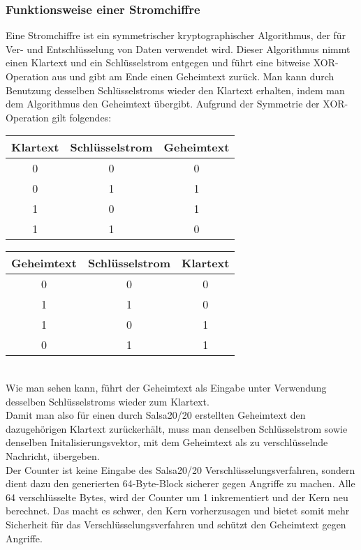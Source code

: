 \documentclass[course=erap]{aspdoc}
\begin{document}
\subsubsection{Funktionsweise einer Stromchiffre}
Eine Stromchiffre ist ein symmetrischer kryptographischer Algorithmus, der für Ver- und Entschlüsselung von Daten verwendet wird. 
Dieser Algorithmus nimmt einen Klartext und ein Schlüsselstrom entgegen und führt eine bitweise XOR-Operation aus und gibt am Ende 
einen Geheimtext zurück. 
Man kann durch Benutzung desselben Schlüsselstroms wieder den Klartext erhalten, indem man dem Algorithmus den Geheimtext übergibt.
Aufgrund der Symmetrie der XOR-Operation gilt folgendes:
\begin{table}[!h]
    \begin{tabular}{|c|c|c|}
    \hline
    Klartext & Schlüsselstrom & Geheimtext \\
    \hline
    0 & 0 & 0  \\
    0 & 1 & 1  \\
    1 & 0 & 1  \\
    1 & 1 & 0  \\
    \hline
    \end{tabular}
    \begin{tabular}{|c|c|c|}
        \hline
        Geheimtext & Schlüsselstrom & Klartext \\
        \hline
         0 & 0 & 0 \\
         1 & 1 & 0 \\
         1 & 0 & 1 \\
         0 & 1 & 1 \\
        \hline
        \end{tabular}
\end{table}
\\
Wie man sehen kann, führt der Geheimtext als Eingabe unter Verwendung desselben Schlüsselstroms wieder zum Klartext.
\vspace{3mm}
\\
Damit man also für einen durch Salsa20/20 erstellten Geheimtext den dazugehörigen Klartext zurückerhält, 
muss man denselben Schlüsselstrom sowie denselben Initalisierungsvektor, mit dem Geheimtext als zu verschlüsselnde Nachricht, übergeben.
\\
Der Counter ist keine Eingabe des Salsa20/20 Verschlüsselungsverfahren, sondern dient dazu den generierten 64-Byte-Block sicherer gegen Angriffe zu machen. Alle 64 verschlüsselte Bytes, wird der Counter um 1 inkrementiert und der Kern neu berechnet. Das macht es schwer, den Kern vorherzusagen und bietet somit mehr Sicherheit für das Verschlüsselungsverfahren und schützt den Geheimtext gegen Angriffe.
\end{document}
